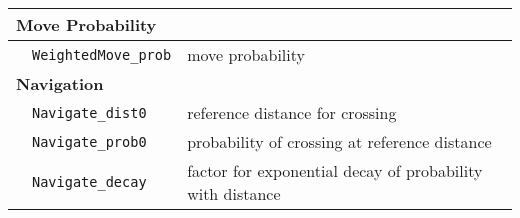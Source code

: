\documentclass[a4paper,oneside]{article}
\begin{document}
\begin{table}[ht!]
\begin{center}
\begin{tabular}{cl|l}
    \hline
    \multicolumn{2}{l}{\bf{Move Probability}}                                \\
    \hline
    \space & \texttt{WeightedMove\_prob}            & move probability          \\

    \multicolumn{2}{l}{\bf{Navigation}}                                \\
    \hline
    \space & \texttt{Navigate\_dist0}               & reference distance for crossing \\
    \space & \texttt{Navigate\_prob0}               & probability of crossing at reference distance \\
    \space & \texttt{Navigate\_decay}               & factor for exponential decay of probability with distance \\
  \end{tabular}

  \end{center}
\end{table}
\end{document}
